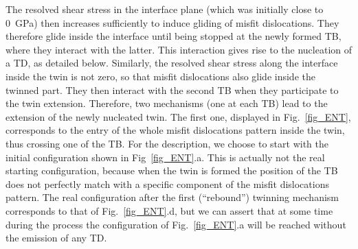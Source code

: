 \documentclass[final,3p,times,twocolumn]{elsarticle}
\begin{document}
The resolved shear stress in the interface plane (which was initially close to 0~GPa) then increases sufficiently to induce gliding of misfit dislocations. They therefore glide inside the interface until being stopped at the newly formed TB, where they interact with the latter. This interaction gives rise to the nucleation of a TD, as detailed below. Similarly, the resolved shear stress along the interface inside the twin is not zero, so that misfit dislocations also glide inside the twinned part. They then interact with the second TB when they participate to the twin extension. Therefore, two mechanisms (one at each TB) lead to the extension of the newly nucleated twin. The first one, displayed in Fig.~\ref{fig_ENT}, corresponds to the entry of the whole misfit dislocations pattern inside the twin, thus crossing one of the TB. For the description, we choose to start with the initial configuration shown in Fig~\ref{fig_ENT}.a. This is actually not the real starting configuration, because when the twin is formed the position of the TB does not perfectly match with a specific component of the misfit dislocations pattern. The real configuration after the first (``rebound'') twinning mechanism corresponds to that of Fig.~\ref{fig_ENT}.d, but we can assert that at some time during the process the  configuration of Fig.~\ref{fig_ENT}.a will be reached without the emission of any TD.
\end{document}
